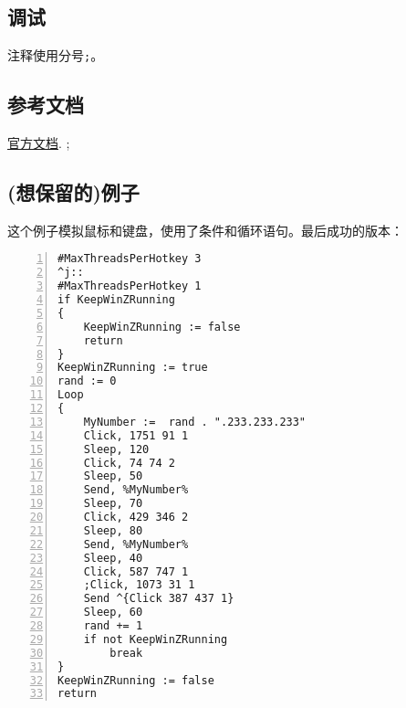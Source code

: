 \documentclass[11pt]{amsart}
\begin{document}
\subsection{调试}

注释使用分号\lstinline|;|。

\subsection{参考文档}
\href{https://wyagd001.github.io/zh-cn/docs/AutoHotkey.htm}{官方文档}.
;
\subsection{(想保留的)例子}
这个例子模拟鼠标和键盘，使用了条件和循环语句。最后成功的版本：
\begin{lstlisting}[numbers=left,numberstyle=\tiny,numbersep=10pt]
#MaxThreadsPerHotkey 3
^j::  
#MaxThreadsPerHotkey 1
if KeepWinZRunning  
{
    KeepWinZRunning := false  
    return  
}
KeepWinZRunning := true
rand := 0
Loop
{
    MyNumber :=  rand . ".233.233.233"
	Click, 1751 91 1
	Sleep, 120
	Click, 74 74 2
	Sleep, 50	
	Send, %MyNumber%
	Sleep, 70	
	Click, 429 346 2
	Sleep, 80
	Send, %MyNumber%
	Sleep, 40
	Click, 587 747 1
	;Click, 1073 31 1
	Send ^{Click 387 437 1}
	Sleep, 60	
	rand += 1
    if not KeepWinZRunning  
        break  
}
KeepWinZRunning := false  
return
\end{lstlisting}
\end{document}
